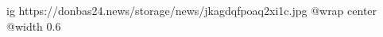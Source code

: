  
 
 
 
 

\ifcmt
  ig https://donbas24.news/storage/news/jkagdqfpoaq2xi1c.jpg
  @wrap center
  @width 0.6
\fi
